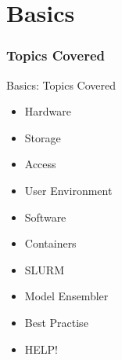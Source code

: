 \part{Basics}
\frame{\partpage}

{
\section{Topics Covered}
%
\begin{frame}{Basics: Topics Covered}

\begin{multicols}{2}
\begin{itemize}
\item Hardware
\item Storage
\item Access
\item User Environment
\item Software

\columnbreak

\item Containers
\item SLURM
\item Model Ensembler
\item Best Practise
\item HELP!
\end{itemize}
\end{multicols}
\end{frame}
}

